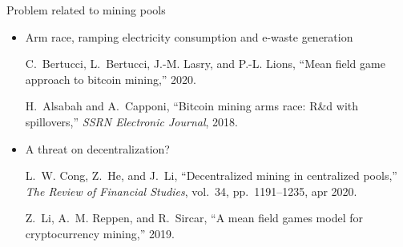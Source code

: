 \documentclass{beamer}
\begin{document}
\begin{frame}{Problem related to mining pools}
\begin{itemize}
  \item Arm race, ramping electricity consumption and e-waste generation
\tiny
\begin{thebibliography}{1}

C.~Bertucci, L.~Bertucci, J.-M. Lasry, and P.-L. Lions, ``Mean field game
  approach to bitcoin mining,'' 2020.

H.~Alsabah and A.~Capponi, ``Bitcoin mining arms race: R{\&}d with
  spillovers,'' {\em {SSRN} Electronic Journal}, 2018.

\end{thebibliography}
\end{itemize}
\begin{itemize}
  \item \normalsize A threat on decentralization?
\tiny
\begin{thebibliography}{1}

L.~W. Cong, Z.~He, and J.~Li, ``Decentralized mining in centralized pools,''
  {\em The Review of Financial Studies}, vol.~34, pp.~1191--1235, apr 2020.

Z.~Li, A.~M. Reppen, and R.~Sircar, ``A mean field games model for
  cryptocurrency mining,'' 2019.
\end{thebibliography}
\end{itemize}
\end{frame}
% 
% 
\end{document}
